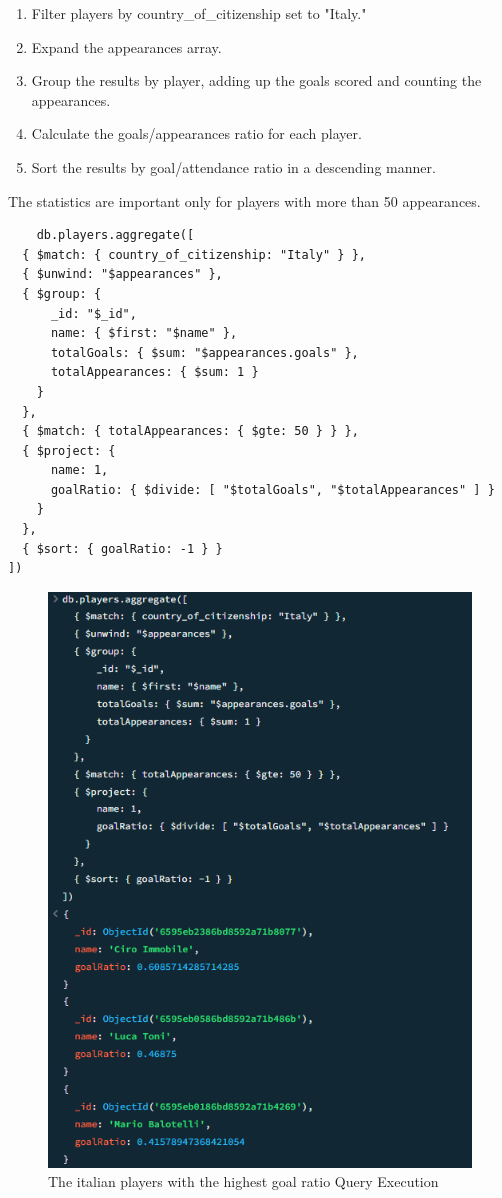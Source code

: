\documentclass{Configuration_Files/PoliMi3i_thesis}
\begin{document}
\begin{enumerate}
    \item Filter players by country\_of\_citizenship set to "Italy."
    \item Expand the appearances array.
    \item Group the results by player, adding up the goals scored and counting the appearances.
    \item Calculate the goals/appearances ratio for each player.
    \item Sort the results by goal/attendance ratio in a descending manner.
\end{enumerate}
The statistics are important only for players with more than 50 appearances.

\begin{verbatim}
    db.players.aggregate([
  { $match: { country_of_citizenship: "Italy" } },
  { $unwind: "$appearances" },
  { $group: { 
      _id: "$_id", 
      name: { $first: "$name" }, 
      totalGoals: { $sum: "$appearances.goals" }, 
      totalAppearances: { $sum: 1 }
    } 
  },
  { $match: { totalAppearances: { $gte: 50 } } },
  { $project: { 
      name: 1, 
      goalRatio: { $divide: [ "$totalGoals", "$totalAppearances" ] }
    } 
  },
  { $sort: { goalRatio: -1 } }
])
\end{verbatim}

\begin{figure}[htbp]
    \centering
    \includegraphics[scale=0.7]{Images/Queries/Italian_ratio_goals/irg.png}
    \caption{The italian players with the highest goal ratio Query Execution}
\end{figure}
  
\end{document}
